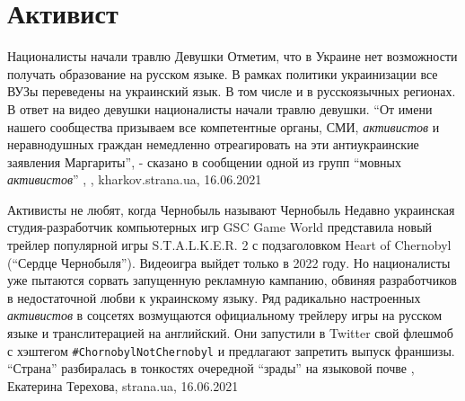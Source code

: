  
 
 
 
 
\chapter{Активист}
\label{sec:slova.aktivist}

Националисты начали травлю Девушки
Отметим, что в Украине нет возможности получать образование на русском языке. В
рамках политики украинизации все ВУЗы переведены на украинский язык. В том
числе и в русскоязычных регионах. В ответ на видео девушки националисты начали
травлю девушки. \enquote{От имени нашего сообщества призываем все компетентные
органы, СМИ, \emph{активистов} и неравнодушных граждан немедленно отреагировать
на эти антиукраинские заявления Маргариты}, - сказано в сообщении одной из
групп \enquote{мовных \emph{активистов}}
, , kharkov.strana.ua, 16.06.2021

Активисты не любят, когда Чернобыль называют Чернобыль
Недавно украинская студия-разработчик компьютерных игр GSC Game World
представила новый трейлер популярной игры S.T.A.L.K.E.R. 2 с подзаголовком
Heart of Chernobyl (\enquote{Сердце Чернобыля}).  Видеоигра выйдет только в 2022 году.
Но националисты уже пытаются сорвать запущенную рекламную кампанию, обвиняя
разработчиков в недостаточной любви к украинскому языку.  Ряд радикально
настроенных \emph{активистов} в соцсетях возмущаются официальному трейлеру игры на
русском языке и транслитерацией на английский. Они запустили в Twitter свой
флешмоб с хэштегом \verb|#ChornobylNotChernobyl| и предлагают запретить выпуск
франшизы.  \enquote{Страна} разбиралась в тонкостях очередной \enquote{зрады} на языковой
почве
, 
Екатерина Терехова, strana.ua, 16.06.2021


